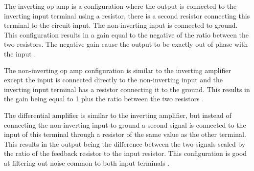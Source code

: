 The inverting op amp is a configuration where the output is connected to the inverting input terminal using a resistor, there is a second resistor connecting this terminal to the circuit input. The non-inverting input is connected to ground. This configuration results in a gain equal to the negative of the ratio between the two resistors. The negative gain cause the output to be exactly out of phase with the input \cite{Fund_Opamps}.

The non-inverting op amp configuration is similar to the inverting amplifier except the input is connected directly to the non-inverting input and the inverting input terminal has a resistor connecting it to the ground. This results in the gain being equal to 1 plus the ratio between the two resistors \cite{Fund_Opamps}.

The differential amplifier is similar to the inverting amplifier, but instead of connecting the non-inverting input to ground a second signal is connected to the input of this terminal through a resistor of the same value  as the other terminal. This results in the output being the difference between the two signals scaled by the ratio of the feedback resistor to the input resistor. This configuration is good at filtering out noise common to both input terminals \cite{Fund_Opamps}. 

